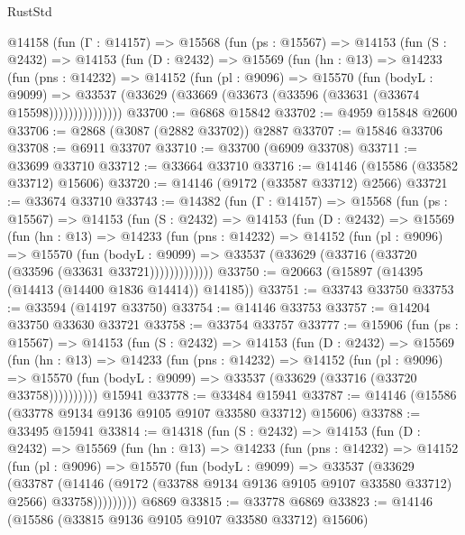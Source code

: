 \begin{lexlean}{RustStd}
\begin{coremodule}
    @14158
      (fun (Γ : @14157) =>
      @15568
        (fun (ps : @15567) =>
        @14153
          (fun (S : @2432) =>
          @14153
            (fun (D : @2432) =>
            @15569
              (fun (hn : @13) =>
              @14233
                (fun (pns : @14232) =>
                @14152
                  (fun (pl : @9096) =>
                  @15570
                    (fun (bodyL : @9099) =>
                    @33537 (@33629 (@33669 (@33673 (@33596 (@33631 (@33674 @15598)))))))))))))))
@33700 := @6868 @15842
@33702 := @4959 @15848 @2600
@33706 := @2868 (@3087 (@2882 @33702)) @2887
@33707 := @15846 @33706
@33708 := @6911 @33707
@33710 := @33700 (@6909 @33708)
@33711 := @33699 @33710
@33712 := @33664 @33710
@33716 := @14146 (@15586 (@33582 @33712) @15606)
@33720 := @14146 (@9172 (@33587 @33712) @2566)
@33721 := @33674 @33710
@33743 := @14382
    (fun (Γ : @14157) =>
    @15568
      (fun (ps : @15567) =>
      @14153
        (fun (S : @2432) =>
        @14153
          (fun (D : @2432) =>
          @15569
            (fun (hn : @13) =>
            @14233
              (fun (pns : @14232) =>
              @14152
                (fun (pl : @9096) =>
                @15570
                  (fun (bodyL : @9099) =>
                  @33537 (@33629 (@33716 (@33720 (@33596 (@33631 @33721)))))))))))))
@33750 := @20663 (@15897 (@14395 (@14413 (@14400 @1836 @14414)) @14185))
@33751 := @33743 @33750
@33753 := @33594 (@14197 @33750)
@33754 := @14146 @33753
@33757 := @14204 @33750 @33630 @33721
@33758 := @33754 @33757
@33777 := @15906
    (fun (ps : @15567) =>
    @14153
      (fun (S : @2432) =>
      @14153
        (fun (D : @2432) =>
        @15569
          (fun (hn : @13) =>
          @14233
            (fun (pns : @14232) =>
            @14152
              (fun (pl : @9096) =>
              @15570 (fun (bodyL : @9099) => @33537 (@33629 (@33716 (@33720 @33758))))))))))
    @15941
@33778 := @33484 @15941
@33787 := @14146 (@15586 (@33778 @9134 @9136 @9105 @9107 @33580 @33712) @15606)
@33788 := @33495 @15941
@33814 := @14318
    (fun (S : @2432) =>
    @14153
      (fun (D : @2432) =>
      @15569
        (fun (hn : @13) =>
        @14233
          (fun (pns : @14232) =>
          @14152
            (fun (pl : @9096) =>
            @15570
              (fun (bodyL : @9099) =>
              @33537
                (@33629
                  (@33787
                    (@14146
                      (@9172 (@33788 @9134 @9136 @9105 @9107 @33580 @33712) @2566)
                      @33758)))))))))
    @6869
@33815 := @33778 @6869
@33823 := @14146 (@15586 (@33815 @9136 @9105 @9107 @33580 @33712) @15606)

\end{coremodule}
\end{lexlean}
